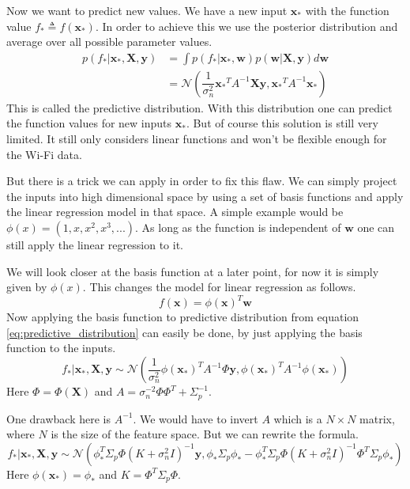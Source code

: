 Now we want to predict new values. We have a new input $\mathbf{x_*}$ with the function value $f_* \triangleq f(\mathbf{x_*})$. In order to achieve this we use the posterior distribution and average over all possible parameter values. \cite[p. 11]{Rasmussen:2005:GPM:1162254}
\begin{equation}\label{eq:predictive_distribution}
\begin{aligned}
p(f_*|\mathbf{x_*},\mathbf{X},\mathbf{y}) &= \int p(f_*|\mathbf{x_*},\mathbf{w})p(\mathbf{w}|\mathbf{X},\mathbf{y})d\mathbf{w}\\
&= \mathcal{N}(\dfrac{1}{\sigma_n^2}\mathbf{x_*}^TA^{-1}\mathbf{X}\mathbf{y},\mathbf{x_*}^TA^{-1}\mathbf{x_*})
\end{aligned}
\end{equation}
This is called the predictive distribution. With this distribution one can predict the function values for new inputs $\mathbf{x_*}$. But of course this solution is still very limited. It still only considers linear functions and won't be flexible enough for the Wi-Fi data. 

But there is a trick we can apply in order to fix this flaw. We can simply project the inputs into high dimensional space by using a set of basis functions and apply the linear regression model in that space. A simple example would be $\phi(x) = (1,x,x^2,x^3,...)$. As long as the function is independent of $\mathbf{w}$ one can still apply the linear regression to it.\cite[p. 11]{Rasmussen:2005:GPM:1162254}

We will look closer at the basis function at a later point, for now it is simply given by $\phi(x)$. This changes the model for linear regression as follows. \cite[p. 12]{Rasmussen:2005:GPM:1162254}
\begin{equation}\label{eq:basis_function}
f(\mathbf{x}) = \phi(\mathbf{x})^T\mathbf{w}
\end{equation}
Now applying the basis function to predictive distribution from equation \ref{eq:predictive_distribution} can easily be done, by just applying the basis function to the inputs. 
\begin{equation}\label{eq:prediction_distri_basis_function}
f_*|\mathbf{x_*},\mathbf{X},\mathbf{y} \sim \mathcal{N}(\dfrac{1}{\sigma_n^2}\phi(\mathbf{x_*})^TA^{-1}\Phi\mathbf{y}, \phi(\mathbf{x_*})^TA^{-1}\phi(\mathbf{x_*}))
\end{equation}
Here $\Phi = \Phi(\mathbf{X})$ and $A = \sigma_n^{-2}\Phi\Phi^T+\Sigma_p^{-1}$.

One drawback here is $A^{-1}$. We would have to invert $A$ which is a $N\times N$ matrix, where $N$ is the size of the feature space. But we can rewrite the formula. \cite[p. 12]{Rasmussen:2005:GPM:1162254}
\begin{equation}\label{eq:final_prediction_distri}
f_*|\mathbf{x_*},\mathbf{X}, \mathbf{y} \sim \mathcal{N}(\phi_*^T\Sigma_p\Phi(K+\sigma_n^2I)^{-1}\mathbf{y}, \phi_*\Sigma_p\phi_*-\phi_*^T\Sigma_p\Phi(K+\sigma_n^2I)^{-1}\Phi^T\Sigma_p\phi_*)
\end{equation}
Here $\phi(\mathbf{x_*}) = \phi_*$ and $K = \Phi^T\Sigma_p\Phi$.

